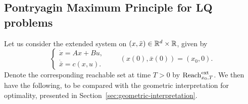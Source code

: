 \subsection{Pontryagin Maximum Principle for LQ problems}

Let us consider the extended system on $(x,\bar x)\in \mathbb{R}^d\times \mathbb{R}$, given by 
\begin{equation}
    \begin{cases}
        \dot x = Ax + B u,\\
        \dot{\bar x} = c(x,u).
    \end{cases}
    \qquad 
    (x(0),\bar x(0)) = (x_0,0).
\end{equation}
Denote the corresponding reachable set at time $T>0$ by $\operatorname{Reach}^{\text{ext}}_{x_0,T}$.
We then have the following, to be compared with the geometric interpretation for optimality, presented in Section~\ref{sec:geometric-interpretation}.


